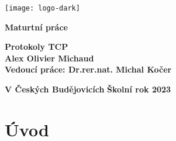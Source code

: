\documentclass[12pt]{article}
\begin{document}
\begin{center}
\hspace{-2cm}
\texttt{[image: logo-dark]}


\vspace{4cm}


\hspace{-2.1cm}
\huge\textbf{Maturtní práce}

\vspace{1.5cm}
\hspace{-2cm}
\huge\textbf{Protokoly TCP}
\vspace{0.75cm}
\\
\hspace{-2cm}
\huge\textbf{Alex Olivier Michaud}
\\
\hspace{-2cm}
\vspace{0.75cm}
\large\textbf{Vedoucí práce: Dr.rer.nat. Michal Kočer}
\end{center}

\vspace{6cm}

\rightline\Huge\textbf{V Českých Budějovicích}
\hspace{4cm}
\Large\textbf{Školní rok 2023 } 		


\begin{flushright} 
\end{flushright}
\thispagestyle{empty}





\clearpage
\tableofcontents
\thispagestyle{empty}
\clearpage
\section{Úvod}
\end{document}
